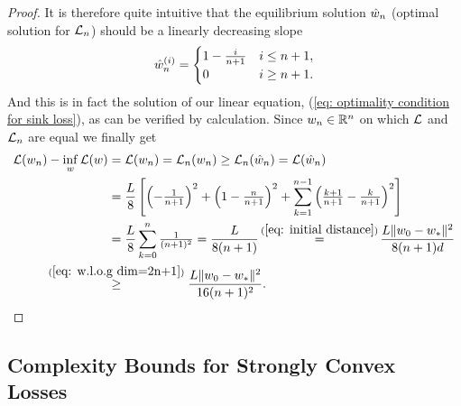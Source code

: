 \begin{proof}
	It is therefore quite intuitive that the equilibrium solution
	\(\hat{w}_n\) (optimal solution for \(\mathcal{L}_n\)) should be a linearly
	decreasing slope
	\begin{align*}
		\hat{w}_n^{(i)} = \begin{cases}
			1 - \tfrac{i}{n+1} & i \le n+1,\\
			0	& i \ge n+1.
		\end{cases}
	\end{align*}	
	And this is in fact the solution of our linear equation, (\ref{eq: optimality
	condition for sink loss}), as can be verified by calculation. Since
	\(w_n \in \mathbb{R}^n\) on which \(\mathcal{L}\) and \(\mathcal{L}_n\) are equal
	we finally get
	\begin{align*}
		\Loss(\weights_n)-\inf_\weights\Loss(\weights)
		&=\Loss(\weights_n) = \Loss_n(\weights_n) \ge \Loss_n(\hat{\weights}_n)
		= \Loss(\hat{\weights}_n)\\
		&= \frac{\ubound}{8}\left[
			\left(-\tfrac1{n+1}\right)^2 + \left(1-\tfrac{n}{n+1}\right)^2
			+ \sum_{k=1}^{n-1}\left(\tfrac{k+1}{n+1}-\tfrac{k}{n+1}\right)^2
		\right]\\
		&= \frac{\ubound}{8}\sum_{k=0}^n \tfrac{1}{(n+1)^2}
		=\frac{\ubound}{8(n+1)}
		\xeq{(\ref{eq: initial distance})} \frac{L\|\weights_0 - \minimum\|^2}{8(n+1)d}\\
		&\lxge{(\ref{eq: w.l.o.g dim=2n+1})}
		\frac{L\|\weights_0 - \minimum\|^2}{16(n+1)^2}.
		\qedhere
	\end{align*}
\end{proof}


\subsection{Complexity Bounds for Strongly Convex Losses}

